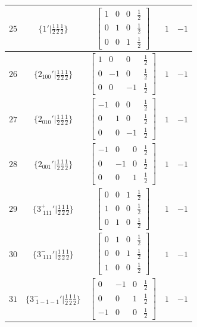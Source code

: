 \documentclass[fleqn,8pt]{jsarticle}
\begin{document}
\begin{longtable}{ccccc}
$ 25 $ & $ \{1{}'|\frac{1}{2} \frac{1}{2} \frac{1}{2}\} $ & $ \begin{bmatrix} 1 & 0 & 0 & \frac{1}{2} \\ 0 & 1 & 0 & \frac{1}{2} \\ 0 & 0 & 1 & \frac{1}{2} \end{bmatrix} $ & $ 1 $ & $ -1 $ \\ \hline
$ 26 $ & $ \{2{}_{100}{}'|\frac{1}{2} \frac{1}{2} \frac{1}{2}\} $ & $ \begin{bmatrix} 1 & 0 & 0 & \frac{1}{2} \\ 0 & -1 & 0 & \frac{1}{2} \\ 0 & 0 & -1 & \frac{1}{2} \end{bmatrix} $ & $ 1 $ & $ -1 $ \\ \hline
$ 27 $ & $ \{2{}_{010}{}'|\frac{1}{2} \frac{1}{2} \frac{1}{2}\} $ & $ \begin{bmatrix} -1 & 0 & 0 & \frac{1}{2} \\ 0 & 1 & 0 & \frac{1}{2} \\ 0 & 0 & -1 & \frac{1}{2} \end{bmatrix} $ & $ 1 $ & $ -1 $ \\ \hline
$ 28 $ & $ \{2{}_{001}{}'|\frac{1}{2} \frac{1}{2} \frac{1}{2}\} $ & $ \begin{bmatrix} -1 & 0 & 0 & \frac{1}{2} \\ 0 & -1 & 0 & \frac{1}{2} \\ 0 & 0 & 1 & \frac{1}{2} \end{bmatrix} $ & $ 1 $ & $ -1 $ \\ \hline
$ 29 $ & $ \{3^{+}_{\,\,111}{}'|\frac{1}{2} \frac{1}{2} \frac{1}{2}\} $ & $ \begin{bmatrix} 0 & 0 & 1 & \frac{1}{2} \\ 1 & 0 & 0 & \frac{1}{2} \\ 0 & 1 & 0 & \frac{1}{2} \end{bmatrix} $ & $ 1 $ & $ -1 $ \\ \hline
$ 30 $ & $ \{3^{-}_{\,\,111}{}'|\frac{1}{2} \frac{1}{2} \frac{1}{2}\} $ & $ \begin{bmatrix} 0 & 1 & 0 & \frac{1}{2} \\ 0 & 0 & 1 & \frac{1}{2} \\ 1 & 0 & 0 & \frac{1}{2} \end{bmatrix} $ & $ 1 $ & $ -1 $ \\ \hline
$ 31 $ & $ \{3^{-}_{\,\,1-1-1}{}'|\frac{1}{2} \frac{1}{2} \frac{1}{2}\} $ & $ \begin{bmatrix} 0 & -1 & 0 & \frac{1}{2} \\ 0 & 0 & 1 & \frac{1}{2} \\ -1 & 0 & 0 & \frac{1}{2} \end{bmatrix} $ & $ 1 $ & $ -1 $ \\ \hline

\end{longtable}
\end{document}

